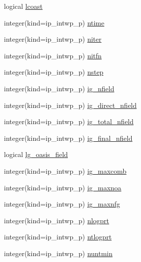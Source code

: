 \begin{DoxyCompactItemize}
logical \hyperlink{namespacemod__oasis__namcouple_a7657e0f9b495e291f26dc31b4f6145aa}{lcoast}
\item 
integer(kind=ip\+\_\+intwp\+\_\+p) \hyperlink{namespacemod__oasis__namcouple_a8a962108487c3ca092633bd4292dbfd6}{ntime}
\item 
integer(kind=ip\+\_\+intwp\+\_\+p) \hyperlink{namespacemod__oasis__namcouple_a6246780a56635119fd8f7935456b06cf}{niter}
\item 
integer(kind=ip\+\_\+intwp\+\_\+p) \hyperlink{namespacemod__oasis__namcouple_a1e5b5efd046e5ab959fba026bd645945}{nitfn}
\item 
integer(kind=ip\+\_\+intwp\+\_\+p) \hyperlink{namespacemod__oasis__namcouple_a66c36f23a77081749dc9e7993b0277f3}{nstep}
\item 
integer(kind=ip\+\_\+intwp\+\_\+p) \hyperlink{namespacemod__oasis__namcouple_a674f201daa7f2e1ba4c71221bda91d9c}{ig\+\_\+nfield}
\item 
integer(kind=ip\+\_\+intwp\+\_\+p) \hyperlink{namespacemod__oasis__namcouple_a531825c07a164f6139e5eebd59e295a2}{ig\+\_\+direct\+\_\+nfield}
\item 
integer(kind=ip\+\_\+intwp\+\_\+p) \hyperlink{namespacemod__oasis__namcouple_a3de3e6eb2bf1e81d77e9c117b7d5985f}{ig\+\_\+total\+\_\+nfield}
\item 
integer(kind=ip\+\_\+intwp\+\_\+p) \hyperlink{namespacemod__oasis__namcouple_a7cf04d6fb678ee65b7fbedc56a0d680a}{ig\+\_\+final\+\_\+nfield}
\item 
logical \hyperlink{namespacemod__oasis__namcouple_aaf6b923ffc7763fd37a5c4c72bdfa34d}{lg\+\_\+oasis\+\_\+field}
\item 
integer(kind=ip\+\_\+intwp\+\_\+p) \hyperlink{namespacemod__oasis__namcouple_abba00866a740567bc1d93cf5850042fd}{ig\+\_\+maxcomb}
\item 
integer(kind=ip\+\_\+intwp\+\_\+p) \hyperlink{namespacemod__oasis__namcouple_ae66cf9f63b6c440406c9b675caef7759}{ig\+\_\+maxnoa}
\item 
integer(kind=ip\+\_\+intwp\+\_\+p) \hyperlink{namespacemod__oasis__namcouple_aab2d4bcc2dc767df51f99f907f4f3e6e}{ig\+\_\+maxnfg}
\item 
integer(kind=ip\+\_\+intwp\+\_\+p) \hyperlink{namespacemod__oasis__namcouple_a7b8c924fdea622759b99d8f61e03ade5}{nlogprt}
\item 
integer(kind=ip\+\_\+intwp\+\_\+p) \hyperlink{namespacemod__oasis__namcouple_a49bd874b06648257f7ce70da19a678b4}{ntlogprt}
\item 
integer(kind=ip\+\_\+intwp\+\_\+p) \hyperlink{namespacemod__oasis__namcouple_a9add83d816dc5cdb41c84747f4ee8962}{nuntmin}

\end{DoxyCompactItemize}
